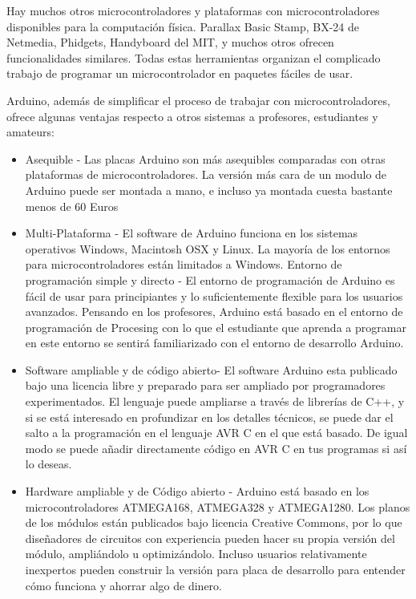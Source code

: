 \documentclass[12pt,a4paper]{report}
\begin{document}
Hay muchos otros microcontroladores y plataformas con microcontroladores disponibles para la computación física. Parallax Basic Stamp, BX-24 de Netmedia, Phidgets, Handyboard del MIT, y muchos otros ofrecen funcionalidades similares. Todas estas herramientas organizan el complicado trabajo de programar un microcontrolador en paquetes fáciles de usar.

Arduino, además de simplificar el proceso de trabajar con microcontroladores, ofrece algunas ventajas respecto a otros sistemas a profesores, estudiantes y amateurs:

\begin{itemize} 
	 \item Asequible - Las placas Arduino son más asequibles comparadas con otras plataformas de microcontroladores. La versión más cara de un modulo de Arduino puede ser montada a mano, e incluso ya montada cuesta bastante menos de 60 Euros
	 
	 \item Multi-Plataforma - El software de Arduino funciona en los sistemas operativos Windows, Macintosh OSX y Linux. La mayoría de los entornos para microcontroladores están limitados a Windows.
Entorno de programación simple y directo - El entorno de programación de Arduino es fácil de usar para principiantes y lo suficientemente flexible para los usuarios avanzados. Pensando en los profesores, Arduino está basado en el entorno de programación de Procesing con lo que el estudiante que aprenda a programar en este entorno se sentirá familiarizado con el entorno de desarrollo Arduino.

	\item Software ampliable y de código abierto- El software Arduino esta publicado bajo una licencia libre y preparado para ser ampliado por programadores experimentados. El lenguaje puede ampliarse a través de librerías de C++, y si se está interesado en profundizar en los detalles técnicos, se puede dar el salto a la programación en el lenguaje AVR C en el que está basado. De igual modo se puede añadir directamente código en AVR C en tus programas si así lo deseas.
	
	\item Hardware ampliable y de Código abierto - Arduino está basado en los microcontroladores ATMEGA168, ATMEGA328 y ATMEGA1280. Los planos de los módulos están publicados bajo licencia Creative Commons, por lo que diseñadores de circuitos con experiencia pueden hacer su propia versión del módulo, ampliándolo u optimizándolo. Incluso usuarios relativamente inexpertos pueden construir la versión para placa de desarrollo para entender cómo funciona y ahorrar algo de dinero.
\end{itemize}
\end{document}

